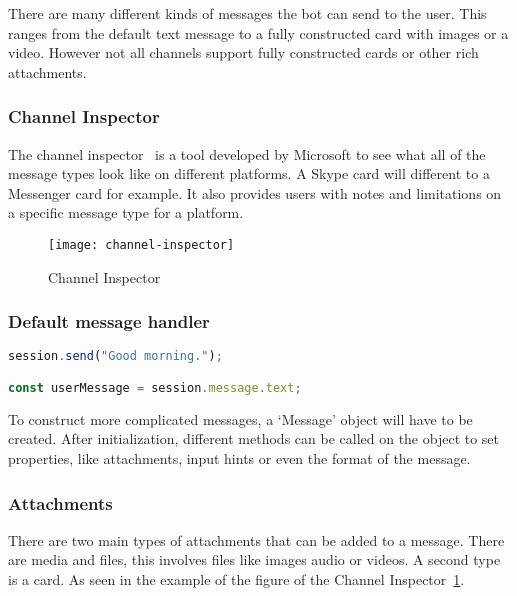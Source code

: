 There are many different kinds of messages the bot can send to the user. This ranges from the default text message to a fully constructed card with images or a video. However not all channels support fully constructed cards or other rich attachments.

\subsubsection{Channel Inspector}

The channel inspector~\cite{channel-inspector} is a tool developed by Microsoft to see what all of the message types look like on different platforms. A Skype card will different to a Messenger card for example. It also provides users with notes and limitations on a specific message type for a platform.

\begin{figure}[ht]
	\centering
	\texttt{[image: channel-inspector]}\label{fig:channel-inspector}
	\caption{Channel Inspector}
\end{figure}

\subsubsection{Default message handler}

\begin{lstlisting}[language=JavaScript,caption=Sending a simple text message or reading the message from the user is very easy,label=listing:send-text-message]
session.send("Good morning.");

const userMessage = session.message.text;
\end{lstlisting}

To construct more complicated messages, a `Message' object will have to be created. After initialization, different methods can be called on the object to set properties, like attachments, input hints or even the format of the message.

\subsubsection{Attachments}

There are two main types of attachments that can be added to a message. There are media and files, this involves files like images audio or videos. A second type is a card. As seen in the example of the figure of the Channel Inspector~\ref{fig:channel-inspector}.

